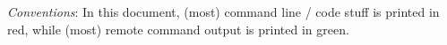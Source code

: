

{\em Conventions}: In this document, (most) command line / code stuff is {\color{DarkRed} printed in red},
while (most) remote command output is {\color{DarkGreen} printed in green}.

